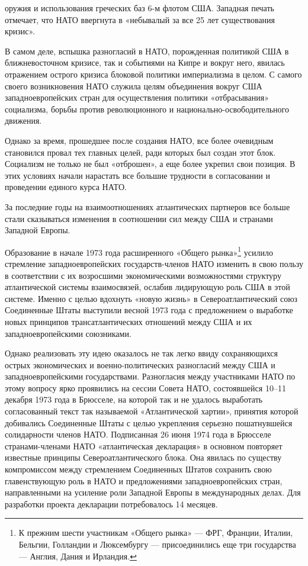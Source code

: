 \documentclass[12pt, a4paper, openany]{book}
\begin{document}
оружия и использования греческих баз 6-м флотом США. Западная печать отмечает, что НАТО ввергнута в «небывалый за все 25 лет существования кризис».
	
В самом деле, вспышка разногласий в НАТО, порожденная политикой США в ближневосточном кризисе, так и событиями на Кипре и вокруг него, явилась отражением острого кризиса блоковой политики империализма в целом. С самого своего возникновения НАТО служила целям объединения вокруг США западноевропейских стран для осуществления политики «отбрасывания» социализма, борьбы против революционного и национально-освободительного движения.
	
Однако за время, прошедшее после создания НАТО, все более очевидным становился провал тех главных целей, ради которых был создан этот блок. Социализм не только не был «отброшен», а еще более укрепил свои позиция. В этих условиях начали нарастать все большие трудности в согласовании и проведении единого курса НАТО.
	
За последние годы на взаимоотношениях атлантических партнеров все больше стали сказываться изменения в соотношении сил между США и странами Западной Европы.
	
Образование в начале 1973 года расширенного «Общего рынка»{\footnote{К прежним шести участникам «Общего рынка» — ФРГ, Франции, Италии, Бельгии, Голландии и Люксембургу — присоединились еще три государства — Англия, Дания и Ирландия.}} усилило стремление западноевропейских государств-членов НАТО изменить в свою пользу в соответствии с их возросшими экономическими возможностями структуру атлантической системы взаимосвязей, ослабив лидирующую роль США в этой системе. Именно с целью вдохнуть «новую жизнь» в Североатлантический союз Соединенные Штаты выступили весной 1973 года с предложением о выработке новых принципов трансатлантических отношений между США и их западноевропейскими союзниками.
	
	
Однако реализовать эту идею оказалось не так легко ввиду сохраняющихся острых экономических и военно-политических разногласий между США и западноевропейскими государствами. Разногласия между участниками НАТО по этому вопросу ярко проявились на сессии Совета НАТО, состоявшейся 10–11 декабря 1973 года в Брюсселе, на которой так и не удалось выработать согласованный текст так называемой «Атлантической хартии», принятия которой добивались Соединенные Штаты с целью укрепления серьезно пошатнувшейся солидарности членов НАТО. Подписанная 26 июня 1974 года в Брюсселе странами-членами НАТО «атлантическая декларация» в основном повторяет известные принципы Североатлантического блока. Она явилась по существу компромиссом между стремлением Соединенных Штатов сохранить свою главенствующую роль в НАТО и предложениями западноевропейских стран, направленными на усиление роли Западной Европы в международных делах. Для разработки проекта декларации потребовалось 14 месяцев.
	
\end{document}
